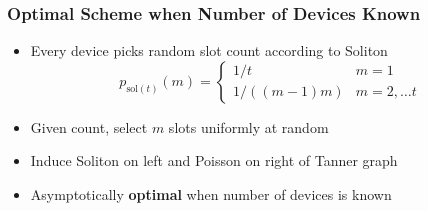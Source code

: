\documentclass[10pt]{beamer}
\begin{document}
\begin{frame}
\frametitle{Optimal Scheme when Number of Devices Known}
\begin{center}

\end{center}
\begin{itemize}
\item Every device picks random slot count according to Soliton
  \begin{equation*}
  p_{\mathrm{sol}(t)}(m)
  = \begin{cases}
  {1}/{t} & m = 1 \\
  {1}/{((m-1)m)} & m = 2, \ldots t
  \end{cases}
  \end{equation*}
\item Given count, select $m$ slots uniformly at random
\item Induce Soliton on left and Poisson on right of Tanner graph
\item Asymptotically \textbf{optimal} when number of devices is known
\end{itemize}
\end{frame}
\end{document}
